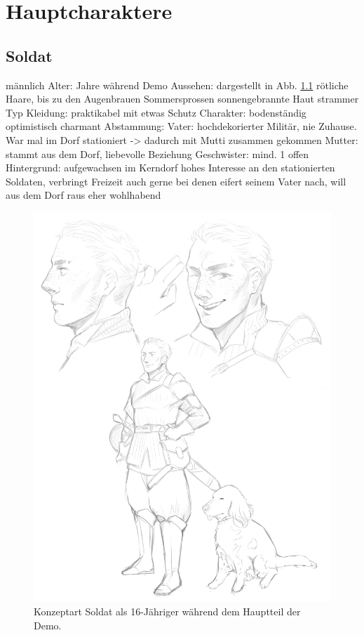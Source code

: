 \chapter{Hauptcharaktere}
\section{Soldat} \label{sec:mc-soldat}
\begin{outline}
	\1 männlich
	\1 Alter:
		 Jahre während Demo
	\1 Aussehen:
		\2 dargestellt in Abb. \ref{fig:mc-soldat}
		\2 rötliche Haare, bis zu den Augenbrauen
		\2 Sommersprossen
		\2 sonnengebrannte Haut
		\2 strammer Typ
	\1 Kleidung:
		\2 praktikabel
		\2 mit etwas Schutz
	\1 Charakter:
		\2 bodenständig 
		\2 optimistisch 
		\2 charmant 
	\1 Abstammung:
		\2 Vater: hochdekorierter Militär, nie Zuhause. War mal im Dorf stationiert -> dadurch mit Mutti zusammen gekommen
		\2 Mutter: stammt aus dem Dorf, liebevolle Beziehung
		\2 Geschwister: mind. 1 offen
	\1 Hintergrund:
		\2 aufgewachsen im Kerndorf
		\2 hohes Interesse an den stationierten Soldaten, verbringt Freizeit auch gerne bei denen
		\2 eifert seinem Vater nach, will aus dem Dorf raus
		\2 eher wohlhabend
\end{outline}

\begin{figure}[tbh]
	\centering
	\includegraphics[width=0.75\textheight]{Abbildungen/Abenteuer/Hauptcharaktere/soldat.png}
	\caption[Konzeptart Soldat]{Konzeptart Soldat als 16-Jähriger während dem Hauptteil der Demo.}
	\label{fig:mc-soldat}
\end{figure}

